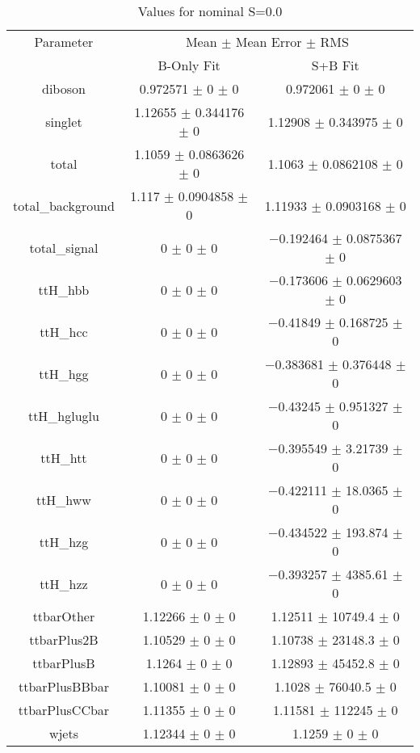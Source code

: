 \begin{table}
\centering
\caption{Values for nominal S=0.0}
\begin{tabular}{ccc}
\toprule
Parameter & \multicolumn{2}{c}{Mean $\pm$ Mean Error $\pm$ RMS}\\
 & B-Only Fit & S+B Fit\\
\midrule
diboson & \num{0.972571} $\pm$ \num{0} $\pm$ \num{0} & \num{0.972061} $\pm$ \num{0} $\pm$ \num{0}\\
singlet & \num{1.12655} $\pm$ \num{0.344176} $\pm$ \num{0} & \num{1.12908} $\pm$ \num{0.343975} $\pm$ \num{0}\\
total & \num{1.1059} $\pm$ \num{0.0863626} $\pm$ \num{0} & \num{1.1063} $\pm$ \num{0.0862108} $\pm$ \num{0}\\
total\_background & \num{1.117} $\pm$ \num{0.0904858} $\pm$ \num{0} & \num{1.11933} $\pm$ \num{0.0903168} $\pm$ \num{0}\\
total\_signal & \num{0} $\pm$ \num{0} $\pm$ \num{0} & \num{-0.192464} $\pm$ \num{0.0875367} $\pm$ \num{0}\\
ttH\_hbb & \num{0} $\pm$ \num{0} $\pm$ \num{0} & \num{-0.173606} $\pm$ \num{0.0629603} $\pm$ \num{0}\\
ttH\_hcc & \num{0} $\pm$ \num{0} $\pm$ \num{0} & \num{-0.41849} $\pm$ \num{0.168725} $\pm$ \num{0}\\
ttH\_hgg & \num{0} $\pm$ \num{0} $\pm$ \num{0} & \num{-0.383681} $\pm$ \num{0.376448} $\pm$ \num{0}\\
ttH\_hgluglu & \num{0} $\pm$ \num{0} $\pm$ \num{0} & \num{-0.43245} $\pm$ \num{0.951327} $\pm$ \num{0}\\
ttH\_htt & \num{0} $\pm$ \num{0} $\pm$ \num{0} & \num{-0.395549} $\pm$ \num{3.21739} $\pm$ \num{0}\\
ttH\_hww & \num{0} $\pm$ \num{0} $\pm$ \num{0} & \num{-0.422111} $\pm$ \num{18.0365} $\pm$ \num{0}\\
ttH\_hzg & \num{0} $\pm$ \num{0} $\pm$ \num{0} & \num{-0.434522} $\pm$ \num{193.874} $\pm$ \num{0}\\
ttH\_hzz & \num{0} $\pm$ \num{0} $\pm$ \num{0} & \num{-0.393257} $\pm$ \num{4385.61} $\pm$ \num{0}\\
ttbarOther & \num{1.12266} $\pm$ \num{0} $\pm$ \num{0} & \num{1.12511} $\pm$ \num{10749.4} $\pm$ \num{0}\\
ttbarPlus2B & \num{1.10529} $\pm$ \num{0} $\pm$ \num{0} & \num{1.10738} $\pm$ \num{23148.3} $\pm$ \num{0}\\
ttbarPlusB & \num{1.1264} $\pm$ \num{0} $\pm$ \num{0} & \num{1.12893} $\pm$ \num{45452.8} $\pm$ \num{0}\\
ttbarPlusBBbar & \num{1.10081} $\pm$ \num{0} $\pm$ \num{0} & \num{1.1028} $\pm$ \num{76040.5} $\pm$ \num{0}\\
ttbarPlusCCbar & \num{1.11355} $\pm$ \num{0} $\pm$ \num{0} & \num{1.11581} $\pm$ \num{112245} $\pm$ \num{0}\\
wjets & \num{1.12344} $\pm$ \num{0} $\pm$ \num{0} & \num{1.1259} $\pm$ \num{0} $\pm$ \num{0}\\
\bottomrule
\end{tabular}
\end{table}